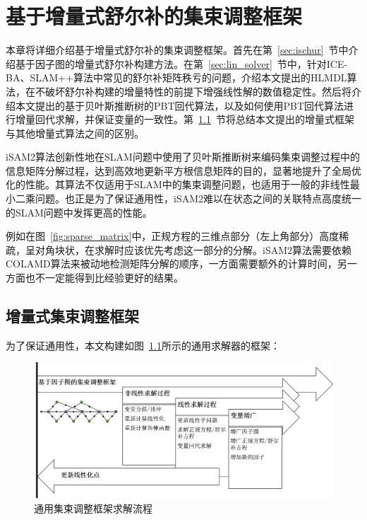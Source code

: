 \chapter{基于增量式舒尔补的集束调整框架}\label{ch:ba}

本章将详细介绍基于增量式舒尔补的集束调整框架。首先在第~\ref{sec:ischur}~节中介绍基于因子图的增量式舒尔补构建方法。在第~\ref{sec:lin_solver}~节中，针对ICE-BA、SLAM++算法中常见的舒尔补矩阵秩亏的问题，介绍本文提出的HLMDL算法，在不破坏舒尔补构建的增量特性的前提下增强线性解的数值稳定性。然后将介绍本文提出的基于贝叶斯推断树的PBT回代算法，以及如何使用PBT回代算法进行增量回代求解，并保证变量的一致性。第~\ref{sec:framework}~节将总结本文提出的增量式框架与其他增量式算法之间的区别。

iSAM2算法\citep{kaess2008isam,kaess2012isam2}创新性地在SLAM问题中使用了贝叶斯推断树来编码集束调整过程中的信息矩阵分解过程，达到高效地更新平方根信息矩阵的目的，显著地提升了全局优化的性能。其算法不仅适用于SLAM中的集束调整问题，也适用于一般的非线性最小二乘问题。也正是为了保证通用性，iSAM2难以在状态之间的关联特点高度统一的SLAM问题中发挥更高的性能。

例如在图~\ref{fig:sparse_matrix}中，正规方程的三维点部分（左上角部分）高度稀疏，呈对角块状，在求解时应该优先考虑这一部分的分解。iSAM2算法需要依赖COLAMD\citep{davis2004algorithm}算法来被动地检测矩阵分解的顺序，一方面需要额外的计算时间，另一方面也不一定能得到比经验更好的结果。





\section{增量式集束调整框架}\label{sec:framework}

为了保证通用性，本文构建如图~\ref{fig:framework}所示的通用求解器的框架：

\begin{figure}[htb!]
    \centering
    \includegraphics[scale=.5]{Pictures/framework.png}
    \caption{通用集束调整框架求解流程}
    \label{fig:framework}
\end{figure}

